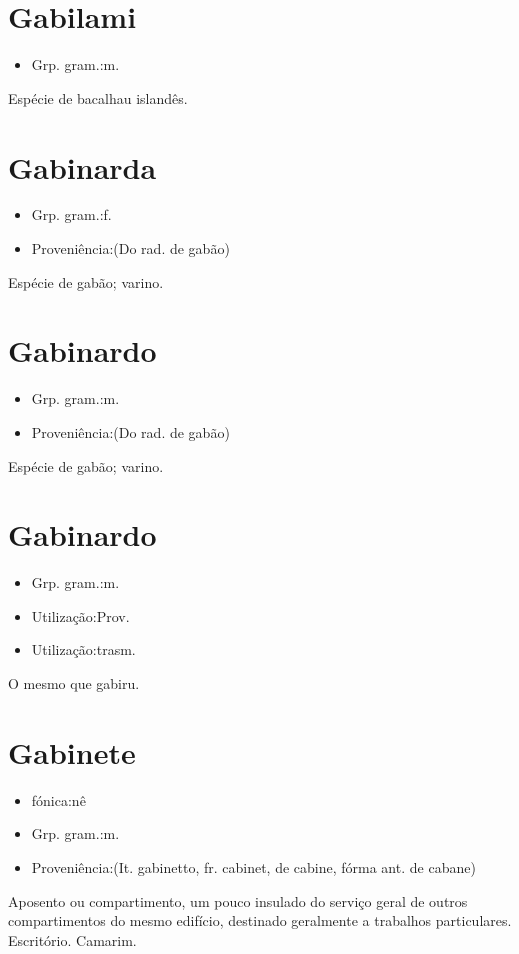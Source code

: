 \section{Gabilami}
\begin{itemize}
\item {Grp. gram.:m.}
\end{itemize}
Espécie de bacalhau islandês.
\section{Gabinarda}
\begin{itemize}
\item {Grp. gram.:f.}
\end{itemize}
\begin{itemize}
\item {Proveniência:(Do rad. de \textunderscore gabão\textunderscore )}
\end{itemize}
Espécie de gabão; varino.
\section{Gabinardo}
\begin{itemize}
\item {Grp. gram.:m.}
\end{itemize}
\begin{itemize}
\item {Proveniência:(Do rad. de \textunderscore gabão\textunderscore )}
\end{itemize}
Espécie de gabão; varino.
\section{Gabinardo}
\begin{itemize}
\item {Grp. gram.:m.}
\end{itemize}
\begin{itemize}
\item {Utilização:Prov.}
\end{itemize}
\begin{itemize}
\item {Utilização:trasm.}
\end{itemize}
O mesmo que \textunderscore gabiru\textunderscore .
\section{Gabinete}
\begin{itemize}
\item {fónica:nê}
\end{itemize}
\begin{itemize}
\item {Grp. gram.:m.}
\end{itemize}
\begin{itemize}
\item {Proveniência:(It. \textunderscore gabinetto\textunderscore , fr. \textunderscore cabinet\textunderscore , de \textunderscore cabine\textunderscore , fórma ant. de \textunderscore cabane\textunderscore )}
\end{itemize}
Aposento ou compartimento, um pouco insulado do serviço geral de outros compartimentos do mesmo edifício, destinado geralmente a trabalhos particulares.
Escritório.
Camarim.
